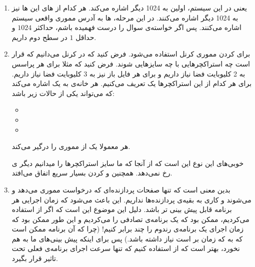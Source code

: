 \begin{enumerate}
    \item یعنی در این سیستم، اولین
    به 1024
    دیگر اشاره می‌کند. هر کدام از
    های
    این
    ها
    نیز به 1024
    دیگر اشاره می‌کنند. در این مرحله،
    ها
    به آدرس مموری واقعی سیستم اشاره می‌کنند.
    پس اگر خواسته‌ی سوال را درست فهمیده باشم، حداکثر
    $1024$
    و حداقل
    $1$
    در سطح دوم داریم.
    \item {}
    برای  کردن مموری کرنل استفاده می‌شود.
    فرض کنید که در کرنل می‌دانیم که قرار است چه استراکچر‌هایی با چه سایز‌هایی
    شوند. فرض کنید که مثلا برای هر پراسس به 2 کلیوبایت فضا نیاز داریم و برای هر فایل باز نیز به 3 کلیوبایت
    فضا نیاز داریم. برای هر کدام از این استراکچر‌ها یک
    تعریف می‌کنیم. هر خانه‌ی
    به یک
    اشاره می‌کند که می‌تواند یکی از حالات زیر باشد:
    \begin{itemize}
        \item {}
        \item {}
        \item {}
    \end{itemize}
    هر
    معمولا یک
    از مموری را درگیر می‌کند.

    خوبی‌های این نوع
    این است که از آنجا که ما سایز استراکچر‌ها را میدانیم دیگر
    ی
    رخ نمی‌دهد. همچنین
     و 
    کردن بسیار سریع اتفاق می‌افتد.
    \item {} بدین معنی است که
    تنها صفحات پردازنده‌ای که درخواست مموری می‌دهد
     و 
    می‌شوند و کاری به بقیه‌ی پردازنده‌ها نداریم. این باعث می‌شود که زمان اجرایی هر برنامه قابل پیش بینی تر باشد.
    دلیل این موضوع این است که اگر از
    استفاده می‌کردیم، ممکن بود که
    یک برنامه‌ی تصادفی را
    می‌کردیم و این طور ممکن بود که زمان اجرای یک برنامه‌ی رندوم را چند برابر کنیم!
    (چرا که آن برنامه ممکن است که به  که زمان بر است نیاز داشته باشد.)
    پس برای اینکه پیش بینی‌های ما به هم نخورد، بهتر است که از
    استفاده کنیم که تنها سرعت اجرای برنامه‌ی فعلی تحت تاثیر قرار بگیرد.
\end{enumerate}